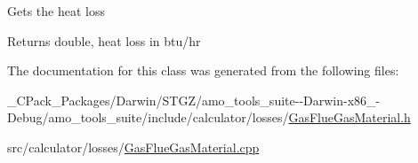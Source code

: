 Gets the heat loss

\begin{DoxyReturn}{Returns}
double, heat loss in btu/hr 
\end{DoxyReturn}


The documentation for this class was generated from the following files\+:\begin{DoxyCompactItemize}
\item 
\+\_\+\+C\+Pack\+\_\+\+Packages/\+Darwin/\+S\+T\+G\+Z/amo\+\_\+tools\+\_\+suite-\/-\/\+Darwin-\/x86\+\_-\/\+Debug/amo\+\_\+tools\+\_\+suite/include/calculator/losses/\hyperlink{___c_pack___packages_2_darwin_2_s_t_g_z_2amo__tools__suite--_darwin-x86__64-_debug_2amo__tools__4660f703408c33ec3ee2abb47d5010e4}{Gas\+Flue\+Gas\+Material.\+h}\item 
src/calculator/losses/\hyperlink{_gas_flue_gas_material_8cpp}{Gas\+Flue\+Gas\+Material.\+cpp}\end{DoxyCompactItemize}
